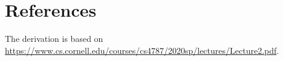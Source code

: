 \documentclass{article}
\theoremstyle{plain}
\theoremstyle{definition}
\theoremstyle{remark}
\begin{document}
\section*{References}

The derivation is based on \url{https://www.cs.cornell.edu/courses/cs4787/2020sp/lectures/Lecture2.pdf}.

% 
% 

\newpage
\appendix
\onecolumn
\end{document}

